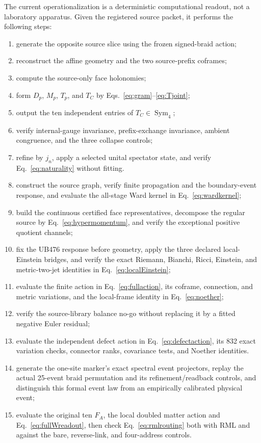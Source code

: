 \documentclass[11pt]{article}
\theoremstyle{definition}
\theoremstyle{remark}
\newcommand{\Sym}{\operatorname{Sym}}
\begin{document}
The current operationalization is a deterministic computational readout, not a laboratory apparatus. Given the registered source packet, it performs the following steps:
\begin{enumerate}
\item generate the opposite source slice using the frozen signed-braid action;
\item reconstruct the affine geometry and the two source-prefix coframes;
\item compute the source-only face holonomies;
\item form $D_p$, $M_p$, $T_p$, and $T_C$ by Eqs.~\eqref{eq:gram}--\eqref{eq:Tjoint};
\item output the ten independent entries of $T_C\in\Sym_4$;
\item verify internal-gauge invariance, prefix-exchange invariance, ambient congruence, and the three collapse controls;
\item refine by $j_n$, apply a selected unital spectator state, and verify Eq.~\eqref{eq:naturality} without fitting.
\item construct the source graph, verify finite propagation and the boundary-event response, and evaluate the all-stage Ward kernel in Eq.~\eqref{eq:wardkernel};
\item build the continuous certified face representatives, decompose the regular source by Eq.~\eqref{eq:hypermomentum}, and verify the exceptional positive quotient channels;
\item fix the UB476 response before geometry, apply the three declared local-Einstein bridges, and verify the exact Riemann, Bianchi, Ricci, Einstein, and metric-two-jet identities in Eq.~\eqref{eq:localEinstein};
\item evaluate the finite action in Eq.~\eqref{eq:fullaction}, its coframe, connection, and metric variations, and the local-frame identity in Eq.~\eqref{eq:noether};
\item verify the source-library balance no-go without replacing it by a fitted negative Euler residual;
\item evaluate the independent defect action in Eq.~\eqref{eq:defectaction}, its 832 exact variation checks, connector ranks, covariance tests, and Noether identities.
\item generate the one-site marker's exact spectral event projectors, replay the actual 25-event braid permutation and its refinement/readback controls, and distinguish this formal event law from an empirically calibrated physical event;
\item evaluate the original ten $F_A$, the local doubled matter action and Eq.~\eqref{eq:fullWreadout}, then check Eq.~\eqref{eq:rmlrouting} both with RML and against the bare, reverse-link, and four-address controls.
\end{enumerate}
\end{document}
